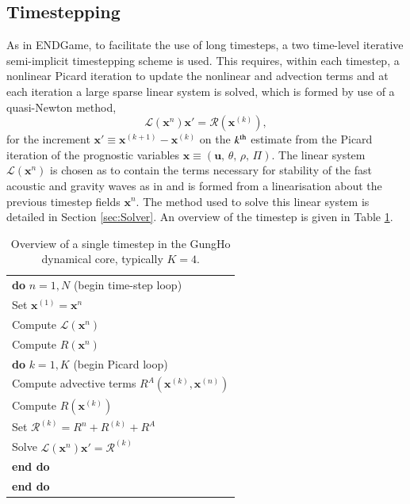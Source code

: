 \documentclass[times]{elsarticle}
\providecommand{\tabularnewline}{\\}
\begin{document}
\subsection{Timestepping\label{sec:sub:timestepping}}
As in ENDGame, to facilitate the use of long timesteps, a two time-level 
iterative semi-implicit timestepping scheme is used. This requires, within each 
timestep, a nonlinear Picard iteration to update the nonlinear and advection terms 
and at each iteration a large sparse linear system is solved, which is formed by 
use of a quasi-Newton method,
%
\begin{equation}
\mathcal{L}\left(\mathbf{x}^n\right)\mathbf{x}' = \mathcal{R}\left(\mathbf{x}^{(k)}\right),\label{eq:quasi-newton}
\end{equation}
%
for the increment $\mathbf{x}'\equiv\mathbf{x}^{(k+1)}-\mathbf{x}^{(k)}$ on the $k^{\rm{th}}$ 
estimate from the Picard iteration of the prognostic variables $\mathbf{x}\equiv\left(\mathbf{u},\,\theta,\,\rho,\,\Pi\right)$. The linear system $\mathcal{L}\left(\mathbf{x}^n\right)$ is chosen as to contain the terms necessary for stability of the fast acoustic and gravity waves as in \citet{QJ:QJ2235} and is formed from a linearisation about the previous timestep fields $\mathbf{x}^n$. The method used to solve this linear system is detailed in Section \ref{sec:Solver}. An overview of the 
timestep is given in Table \ref{tab:timestep}.
%
\begin{table}
\begin{centering}
\begin{tabular}{l}
\hline 
\textbf{do} $n=1,N$ (begin time-step loop)\tabularnewline
\hspace{0.5cm}Set $\mathbf{x}^{(1)} = \mathbf{x}^n$\tabularnewline
\hspace{0.5cm}Compute $\mathcal{L}\left(\mathbf{x}^n\right)$\tabularnewline
\hspace{0.5cm}Compute $R\left(\mathbf{x}^n\right)$\tabularnewline
\hspace{0.5cm}\textbf{do} $k=1,K$ (begin Picard loop)\tabularnewline
\hspace{1.0cm}Compute advective terms $R^A\left(\mathbf{x}^{(k)},\mathbf{x}^{(n)}\right)$\tabularnewline
\hspace{1.0cm}Compute $R\left(\mathbf{x}^(k)\right)$\tabularnewline
\hspace{1.0cm}Set $\mathcal{R}^{(k)} = R^n + R^{(k)} + R^A$\tabularnewline

\hspace{1.0cm}Solve $\mathcal{L}\left(\mathbf{x}^n\right)\mathbf{x}' = \mathcal{R}^{(k)}$\tabularnewline
\hspace{0.5cm}\textbf{end do}\tabularnewline
\textbf{end do}\tabularnewline
\hline
\end{tabular}
\end{centering}
\caption{\label{tab:timestep}Overview of a single timestep in the GungHo dynamical core, typically $K=4$.}
\end{table}
%
\end{document}
